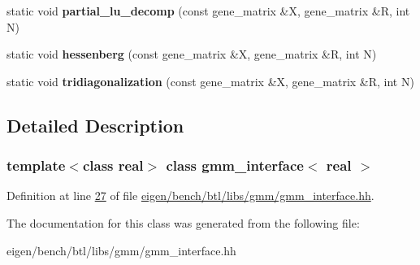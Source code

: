 \begin{DoxyCompactItemize}
\item 
\mbox{\label{classgmm__interface_a199ec7e27ecab364d889f5317885b8b7}} 
static void {\bfseries partial\+\_\+lu\+\_\+decomp} (const gene\+\_\+matrix \&X, gene\+\_\+matrix \&R, int N)
\item 
\mbox{\label{classgmm__interface_a07c8359f77d9d52fdb35009acf1f7b37}} 
static void {\bfseries hessenberg} (const gene\+\_\+matrix \&X, gene\+\_\+matrix \&R, int N)
\item 
\mbox{\label{classgmm__interface_ad184d3cbcb2a3e484720e23696fe79fd}} 
static void {\bfseries tridiagonalization} (const gene\+\_\+matrix \&X, gene\+\_\+matrix \&R, int N)
\end{DoxyCompactItemize}


\subsection{Detailed Description}
\subsubsection*{template$<$class real$>$\newline
class gmm\+\_\+interface$<$ real $>$}



Definition at line \hyperlink{eigen_2bench_2btl_2libs_2gmm_2gmm__interface_8hh_source_l00027}{27} of file \hyperlink{eigen_2bench_2btl_2libs_2gmm_2gmm__interface_8hh_source}{eigen/bench/btl/libs/gmm/gmm\+\_\+interface.\+hh}.



The documentation for this class was generated from the following file\+:\begin{DoxyCompactItemize}
\item 
eigen/bench/btl/libs/gmm/gmm\+\_\+interface.\+hh\end{DoxyCompactItemize}
